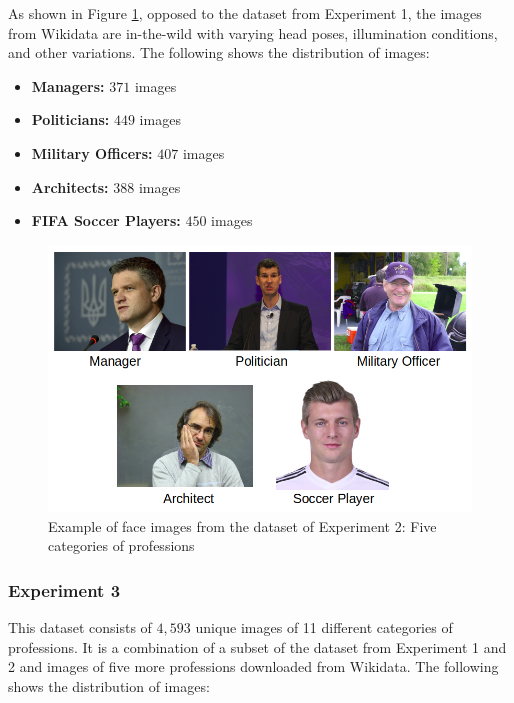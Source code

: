 \documentclass[12pt,english]{article}
\begin{document}
As shown in Figure \ref{fig:prof}, opposed to the dataset from Experiment 1, the images from Wikidata are in-the-wild with varying head poses, illumination conditions, and other variations. The following shows the distribution of images:

\begin{itemize}
\item \textbf{Managers: } $371$ images
\item \textbf{Politicians: } $449$ images
\item \textbf{Military Officers: } $407$ images
\item \textbf{Architects: } $388$ images
\item \textbf{FIFA Soccer Players: } $450$ images
\end{itemize}

\begin{figure}[!tbp]
 \centering
    \includegraphics[width=0.7\columnwidth]{figures/ex2.png}
    \caption{Example of face images from the dataset of Experiment 2: Five categories of professions \cite{data1}}
	\label{fig:prof}
\end{figure}

\subsubsection{Experiment 3}

\quad
This dataset consists of $4,593$ unique images of 11 different categories of professions. It is a combination of a subset of the dataset from Experiment 1 and 2 and images of five more professions downloaded from Wikidata. The following shows the distribution of images:
\end{document}
